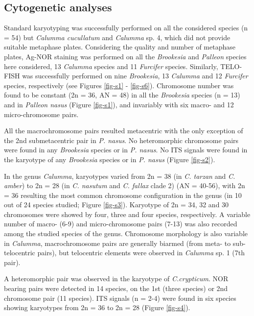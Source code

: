 \documentclass[a4paper, 12pt]{article}
\begin{document}
\subsection{Cytogenetic analyses}

Standard karyotyping was successfully performed on all the considered species (n = 54) but \textit{Calumma cucullatum} and \textit{Calumma} sp. 4, which did not provide suitable metaphase plates.
Considering the quality and number of metaphase plates, Ag-NOR staining was performed on all the \textit{Brookesia} and \textit{Palleon} species here considered, 13 \textit{Calumma} species and 11 \textit{Furcifer} species. 
Similarly, TELO-FISH was successfully performed on nine \textit{Brookesia}, 13 \textit{Calumma} and 12 \textit{Furcifer} species, respectively (see Figures \ref{fig-s1} - \ref{fig-s6}).
Chromosome number was found to be constant (2n = 36, AN = 48) in all the \textit{Brookesia} species (n = 13) and in \textit{Palleon nasus} (Figure \ref{fig-s1}), and invariably with six macro- and 12 micro-chromosome pairs.

\noindent All the macrochromosome pairs resulted metacentric with the only exception of the 2nd submetacentric pair in \textit{P. nasus}. 
No heteromorphic chromosome pairs were found in any \textit{Brookesia} species or in \textit{P. nasus}.
No ITS signals were found in the karyotype of any \textit{Brookesia} species or in \textit{P. nasus} (Figure \ref{fig-s2}).

\noindent In the genus \textit{Calumma}, karyotypes varied from 2n = 38 (in \textit{C. tarzan} and \textit{C. amber}) to 2n = 28 (in \textit{C. nasutum} and \textit{C. fallax} clade 2) (AN = 40-56), with 2n = 36 resulting the most common chromosome configuration in the genus (in 10 out of 24 species studied; Figure \ref{fig-s3}). 
Karyotype of 2n = 34, 32 and 30 chromosomes were showed by four, three and four species, respectively. 
A variable number of macro- (6-9) and micro-chromosome pairs (7-13) was also recorded among the studied species of the genus. 
Chromosome morphology is also variable in \textit{Calumma}, macrochromosome pairs are generally biarmed (from meta- to sub-telocentric pairs), but telocentric elements were observed in \textit{Calumma} sp. 1 (7th pair). 

\noindent A heteromorphic pair was observed in the karyotype of \textit{C.crypticum}. 
NOR bearing pairs were detected in 14 species, on the 1st (three species) or 2nd chromosome pair (11 species). 
ITS signals (n = 2-4) were found in six species showing karyotypes from 2n = 36 to 2n = 28 (Figure \ref{fig-s4}).
\end{document}
